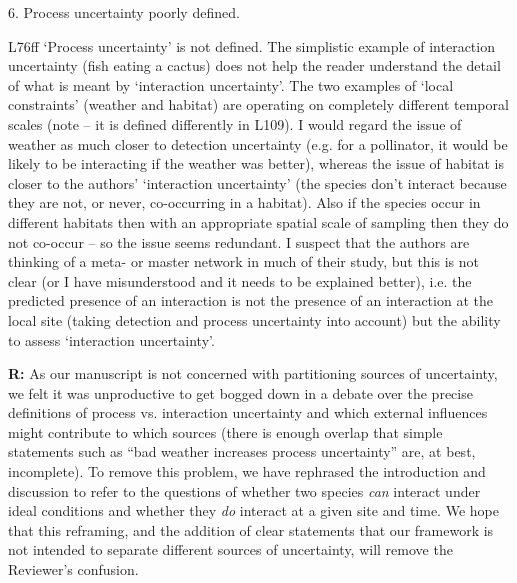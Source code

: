 \documentclass[12pt]{letter}
\newenvironment{refquote}{\bigskip \begin{it}}{\end{it}\smallskip}
\begin{document}
	6. Process uncertainty poorly defined.

		\begin{refquote}
		L76ff `Process uncertainty' is not defined. The simplistic example of interaction uncertainty (fish eating a cactus) does not help the reader understand the detail of what is meant by `interaction uncertainty'. The two examples of `local constraints' (weather and habitat) are operating on completely different temporal scales (note – it is defined differently in L109). I would regard the issue of weather as much closer to detection uncertainty (e.g. for a pollinator, it would be likely to be interacting if the weather was better), whereas the issue of habitat is closer to the authors' `interaction uncertainty' (the species don't interact because they are not, or never, co-occurring in a habitat). Also if the species occur in different habitats then with an appropriate spatial scale of sampling then they do not co-occur – so the issue seems redundant. I suspect that the authors are thinking of a meta- or master network in much of their study, but this is not clear (or I have misunderstood and it needs to be explained better), i.e. the predicted presence of an interaction is not the presence of an interaction at the local site (taking detection and process uncertainty into account) but the ability to assess `interaction uncertainty'.
		\end{refquote}


		\textbf{R:} As our manuscript is not concerned with partitioning sources of uncertainty, we felt it was unproductive to get bogged down in a debate over the precise definitions of process vs. interaction uncertainty and which external influences might contribute to which sources (there is enough overlap that simple statements such as ``bad weather increases process uncertainty'' are, at best, incomplete). To remove this problem, we have rephrased the introduction and discussion to refer to the questions of whether two species \emph{can} interact under ideal conditions and whether they \emph{do} interact at a given site and time. We hope that this reframing, and the addition of clear statements that our framework is not intended to separate different sources of uncertainty, will remove the Reviewer's confusion.
\end{document}
